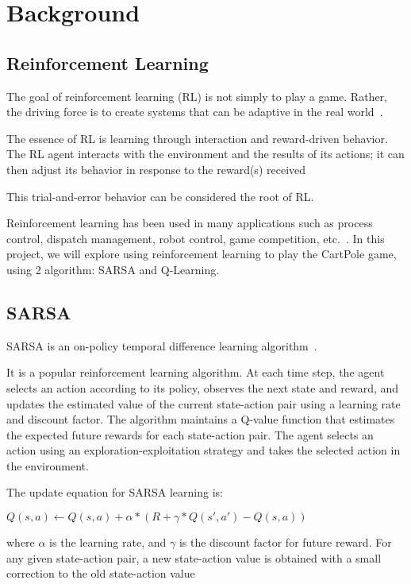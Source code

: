 \section{Background}

\subsection{Reinforcement Learning}
The goal of reinforcement learning (RL) is not simply to play a game. Rather, the driving force is to create systems that can be adaptive in the real world~\cite{Arulkumaran_2017}.

The essence of RL is learning through interaction and reward-driven behavior. The RL agent interacts with the environment and the results of its actions; it can then adjust its behavior in
response to the reward(s) received~\citep{Arulkumaran_2017}

This trial-and-error behavior can be considered the root of RL.

Reinforcement learning has been used in many applications such as process control, dispatch management, robot control, game competition, etc.~\citep{qiang2011reinforcement}. In this project, we
will explore using reinforcement learning to play the CartPole game, using 2 algorithm: SARSA and Q-Learning.

\subsection{SARSA}
SARSA is an on-policy temporal difference learning algorithm~\citep{sutton2018reinforcement}.

It is a popular reinforcement learning algorithm. At each time step, the agent selects an action according to its policy, observes the next state and reward, and updates the estimated value of the current state-action pair using a learning rate and discount factor. 
The algorithm maintains a Q-value function that estimates the expected future rewards for each state-action pair. The agent selects an action using an exploration-exploitation strategy and takes the selected action in the environment.

The update equation for SARSA learning is:

$Q(s,a) \leftarrow Q(s,a) + \alpha*(R + \gamma*Q(s',a') - Q(s,a))$

where $\alpha$ is the learning rate, and $\gamma$ is the discount factor for future reward. For any given state-action pair, a new state-action value is obtained
with a small correction to the old state-action value~\citep{graepel2004learning}

